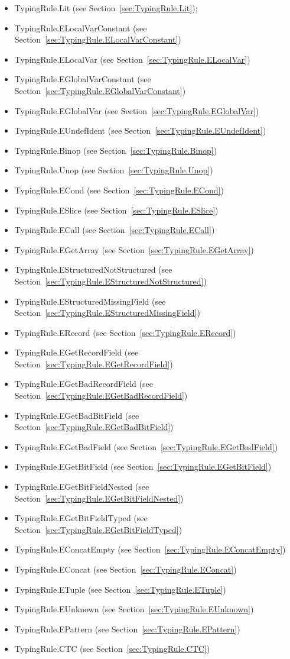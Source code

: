\documentclass{book}
\begin{document}
\begin{itemize}
\item TypingRule.Lit (see Section~\ref{sec:TypingRule.Lit});
\item TypingRule.ELocalVarConstant (see Section~\ref{sec:TypingRule.ELocalVarConstant})
\item TypingRule.ELocalVar (see Section~\ref{sec:TypingRule.ELocalVar})
\item TypingRule.EGlobalVarConstant (see Section~\ref{sec:TypingRule.EGlobalVarConstant})
\item TypingRule.EGlobalVar (see Section~\ref{sec:TypingRule.EGlobalVar})
\item TypingRule.EUndefIdent (see Section~\ref{sec:TypingRule.EUndefIdent})
\item TypingRule.Binop (see Section~\ref{sec:TypingRule.Binop})
\item TypingRule.Unop (see Section~\ref{sec:TypingRule.Unop})
\item TypingRule.ECond (see Section~\ref{sec:TypingRule.ECond})
\item TypingRule.ESlice (see Section~\ref{sec:TypingRule.ESlice})
\item TypingRule.ECall (see Section~\ref{sec:TypingRule.ECall})
\item TypingRule.EGetArray (see Section~\ref{sec:TypingRule.EGetArray})
\item TypingRule.EStructuredNotStructured (see Section~\ref{sec:TypingRule.EStructuredNotStructured})
\item TypingRule.EStructuredMissingField (see Section~\ref{sec:TypingRule.EStructuredMissingField})
\item TypingRule.ERecord (see Section~\ref{sec:TypingRule.ERecord})
\item TypingRule.EGetRecordField (see Section~\ref{sec:TypingRule.EGetRecordField})
\item TypingRule.EGetBadRecordField (see Section~\ref{sec:TypingRule.EGetBadRecordField})
\item TypingRule.EGetBadBitField (see Section~\ref{sec:TypingRule.EGetBadBitField})
\item TypingRule.EGetBadField (see Section~\ref{sec:TypingRule.EGetBadField})
\item TypingRule.EGetBitField (see Section~\ref{sec:TypingRule.EGetBitField})
\item TypingRule.EGetBitFieldNested (see Section~\ref{sec:TypingRule.EGetBitFieldNested})
\item TypingRule.EGetBitFieldTyped (see Section~\ref{sec:TypingRule.EGetBitFieldTyped})
\item TypingRule.EConcatEmpty (see Section~\ref{sec:TypingRule.EConcatEmpty})
\item TypingRule.EConcat (see Section~\ref{sec:TypingRule.EConcat})
\item TypingRule.ETuple (see Section~\ref{sec:TypingRule.ETuple})
\item TypingRule.EUnknown (see Section~\ref{sec:TypingRule.EUnknown})
\item TypingRule.EPattern (see Section~\ref{sec:TypingRule.EPattern})
\item TypingRule.CTC (see Section~\ref{sec:TypingRule.CTC})
\end{itemize}
\end{document}
